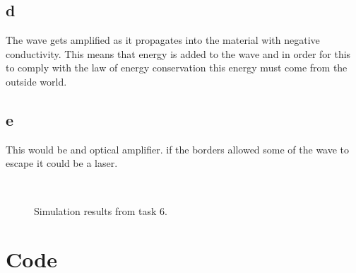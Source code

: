 \documentclass[12pt,a4paper]{article}
\begin{document}
\subsection{d}
The wave gets amplified as it propagates into the material with negative conductivity. This means that energy is added to the wave and in order for this to comply with the law of energy conservation this energy must come from the outside world.
\subsection{e}
This would be and optical amplifier. if the borders allowed some of the wave to escape it could be a laser.
\begin{figure}
  \centering
    \begin{subfigure}[b]{0.7\textwidth}
        \noindent\makebox[\textwidth]{\scalebox{0.7}{}}
        \label{fig:task6_1}
    \end{subfigure}\\
    \begin{subfigure}[b]{0.49\textwidth}
        \noindent\makebox[\textwidth]{\scalebox{0.7}{}}
        \label{fig:task6_2}
    \end{subfigure}
  \caption{Simulation results from task 6.}
  \label{fig:task6}
\end{figure}

\newpage
\appendix
\section{Code}
\begin{changemargin}{-3cm}{0.5cm}

\end{changemargin}
\end{document}
